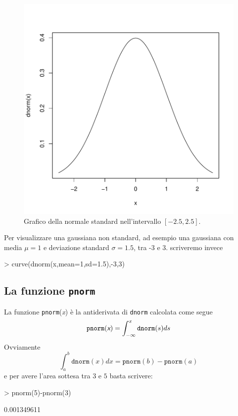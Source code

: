 \documentclass[onecolumn,12pt]{book}
\newcommand{\varia}[1]{\textsl{\textsf{#1}}}
\begin{document}
\begin{figure}[htbp]
\begin{center}
\includegraphics{RbookParte2-148}
\caption{ Grafico della normale standard nell'intervallo $[-2.5,2.5]$. }
\label{fig:normalesta}
\end{center}
\end{figure}
Per  visualizzare una gaussiana non standard, ad esempio una gaussiana con media $\mu=1$ e  deviazione standard $\sigma=1.5$, tra -3 e 3. scriveremo invece
\begin{Schunk}
\begin{Sinput}
> curve(dnorm(x,mean=1,sd=1.5),-3,3)
\end{Sinput}
\end{Schunk}
\subsection{La funzione \texttt{pnorm}}
La funzione \texttt{pnorm}(\varia{x})   \`e la antiderivata di \texttt{dnorm} calcolata come segue
\begin{equation*}\texttt{pnorm}(\varia{x}) =\int_{-\infty}^x  \texttt{dnorm}(s)ds
\end{equation*}
Ovviamente
$$\int_a^b \texttt{dnorm}(x)dx=\texttt{pnorm}(b)-\texttt{pnorm}(a)$$
e per avere l'area sottesa tra $3$ e $5$  basta scrivere:
\begin{Schunk}
\begin{Sinput}
> pnorm(5)-pnorm(3)
\end{Sinput}
\begin{Soutput}
[1] 0.001349611
\end{Soutput}
\end{Schunk}
\end{document}
